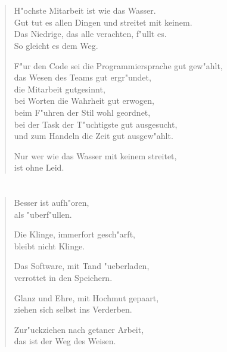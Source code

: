 \documentclass[a4paper,10pt,openany]{book}
\begin{document}
\chapter{}
\begin{verse}
H"ochste Mitarbeit ist wie das Wasser.\\
Gut tut es allen Dingen und streitet mit keinem.\\
Das Niedrige, das alle verachten, f"ullt es.\\
So gleicht es dem Weg.

F"ur den Code sei die Programmiersprache gut gew"ahlt,\\
das Wesen des Teams gut ergr"undet,\\
die Mitarbeit gutgesinnt,\\
bei Worten die Wahrheit gut erwogen,\\
beim F"uhren der Stil wohl geordnet,\\
bei der Task der T"uchtigste gut ausgesucht,\\
und zum Handeln die Zeit gut ausgew"ahlt.

Nur wer wie das Wasser mit keinem streitet,\\
ist ohne Leid.
\end{verse}

\chapter{}
\begin{verse}
    Besser ist aufh"oren,\\
    als "uberf"ullen.

    Die Klinge, immerfort gesch"arft,\\
    bleibt nicht Klinge.

    Das Software, mit Tand "ueberladen,\\
    verrottet in den Speichern.

    Glanz und Ehre, mit Hochmut gepaart,\\
    ziehen sich selbst ins Verderben.

    Zur"uckziehen nach getaner Arbeit,\\
    das ist der Weg des Weisen.
\end{verse}

\end{document}
